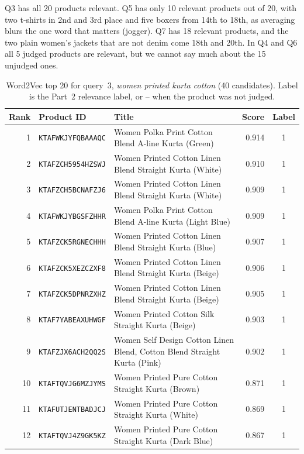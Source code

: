 \documentclass[11pt,a4paper]{article}
\begin{document}
Q3 has all 20 products relevant. Q5 has only 10 relevant products out of 20, with two t-shirts in 2nd and 3rd place and five boxers from 14th to 18th, as averaging blurs the one word that matters (jogger).
Q7 has 18 relevant products, and the two plain women's jackets that are not denim come 18th and 20th. In Q4 and Q6 all 5 judged products are relevant, but we cannot say much about the 15 unjudged ones.


\begin{table}[htbp]
  \centering
  \small
  \caption{Word2Vec top 20 for query~3, \emph{women printed kurta cotton} (40 candidates). Label is
  the Part~2 relevance label, or -- when the product was not judged.}
  \label{tab:w2v-q3}
  \begin{tabular}{rlp{7.2cm}rc}
    \toprule
    Rank & Product ID & Title & Score & Label \\
    \midrule
    1 & \texttt{KTAFWKJYFQBAAAQC} & Women Polka Print Cotton Blend A-line Kurta (Green) & 0.914 & 1 \\
    2 & \texttt{KTAFZCH5954HZSWJ} & Women Printed Cotton Linen Blend Straight Kurta (White) & 0.910 & 1 \\
    3 & \texttt{KTAFZCH5BCNAFZJ6} & Women Printed Cotton Linen Blend Straight Kurta (White) & 0.909 & 1 \\
    4 & \texttt{KTAFWKJYBGSFZHHR} & Women Polka Print Cotton Blend A-line Kurta (Light Blue) & 0.909 & 1 \\
    5 & \texttt{KTAFZCK5RGNECHHH} & Women Printed Cotton Linen Blend Straight Kurta (Blue) & 0.907 & 1 \\
    6 & \texttt{KTAFZCK5XEZCZXF8} & Women Printed Cotton Linen Blend Straight Kurta (Beige) & 0.906 & 1 \\
    7 & \texttt{KTAFZCK5DPNRZXHZ} & Women Printed Cotton Linen Blend Straight Kurta (Beige) & 0.905 & 1 \\
    8 & \texttt{KTAF7YABEAXUHWGF} & Women Printed Cotton Silk Straight Kurta (Beige) & 0.903 & 1 \\
    9 & \texttt{KTAFZJX6ACH2QQ2S} & Women Self Design Cotton Linen Blend, Cotton Blend Straight Kurta (Pink) & 0.902 & 1 \\
    10 & \texttt{KTAFTQVJG6MZJYMS} & Women Printed Pure Cotton Straight Kurta (Brown) & 0.871 & 1 \\
    11 & \texttt{KTAFUTJENTBADJCJ} & Women Printed Pure Cotton Straight Kurta (White) & 0.869 & 1 \\
    12 & \texttt{KTAFTQVJ4Z9GK5KZ} & Women Printed Pure Cotton Straight Kurta (Dark Blue) & 0.867 & 1 \\

\end{tabular}
\end{table}
\end{document}
